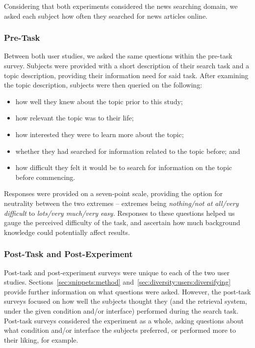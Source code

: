 Considering that both experiments considered the news searching domain, we asked each subject how often they searched for news articles online.

\subsubsection{Pre-Task}
Between both user studies, we asked the same questions within the pre-task survey. Subjects were provided with a short description of their search task and a topic description, providing their information need for said task. After examining the topic description, subjects were then queried on the following:

\begin{itemize}
    \item{how well they knew about the topic prior to this study;}
    \item{how relevant the topic was to their life;}
    \item{how interested they were to learn more about the topic;}
    \item{whether they had searched for information related to the topic before; and}
    \item{how difficult they felt it would be to search for information on the topic before commencing.}
\end{itemize}

Responses were provided on a seven-point scale, providing the option for neutrality between the two extremes -- extremes being \emph{nothing/not at all/very difficult} to \emph{lots/very much/very easy.} Responses to these questions helped us gauge the perceived difficulty of the task, and ascertain how much background knowledge could potentially affect results.

\subsubsection{Post-Task and Post-Experiment}
Post-task and post-experiment surveys were unique to each of the two user studies. Sections~\ref{sec:snippets:method} and~\ref{sec:diversity:users:diversifying} provide further information on what questions were asked. However, the post-task surveys focused on how well the subjects thought they (and the retrieval system, under the given condition and/or interface) performed during the search task. Post-task surveys considered the experiment as a whole, asking questions about what condition and/or interface the subjects preferred, or performed more to their liking, for example.

